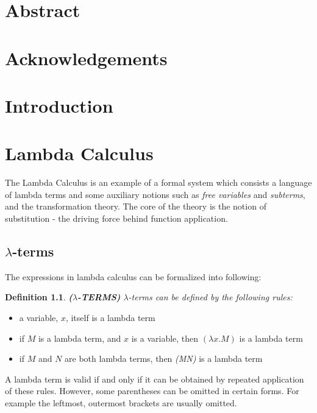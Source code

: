\documentclass[a4paper,11pt,twoside]{report}
\newtheorem{def1}{\textbf{Definition}}[chapter]
\begin{document}
\tableofcontents

\relax

\chapter*{Abstract}

\chapter*{Acknowledgements}
\chapter*{Introduction}

\chapter{Lambda Calculus}
The Lambda Calculus is an example of a formal system which consists a language of lambda terms and some auxiliary notions such as \textit{free variables} and \textit{subterms}, and the transformation theory. The core of the theory is the notion of substitution - the driving force behind function application. 


\section{$\lambda$-terms}

\noindent The expressions in lambda calculus can be formalized into following: 


\begin{def1}
\normalfont \textbf{($\lambda$-TERMS)} $\lambda$-terms can be defined by the following rules:
\end{def1}

\begin{itemize}
\item a variable, $x$, itself is a lambda term
\item if $M$ is a lambda term, and $x$ is a variable, then $(\lambda x.M)$ is a lambda term
\item if $M$ and $N$ are both lambda terms, then \textit{(MN)} is a lambda term
\end{itemize}
A lambda term is valid if and only if it can be obtained by repeated application of these rules. However, some parentheses can be omitted in certain forms. For example the leftmost, outermost brackets are usually omitted.
\end{document}
